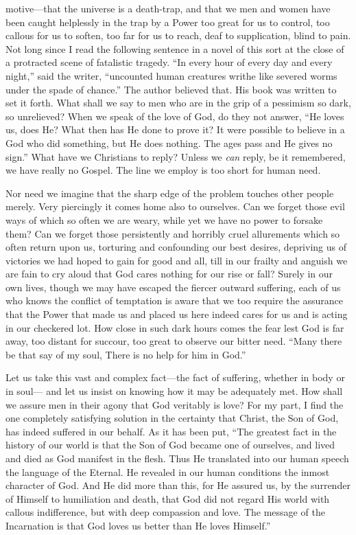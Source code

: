 \documentclass[12pt,a5paper,oneside]{book}
\begin{document}
motive---that the universe is a death-trap,
and that we men and women have been caught
helplessly in the trap by a Power too great
for us to control, too callous for us to soften, too
far for us to reach, deaf to supplication, blind
to pain. Not long since I read the following
sentence in a novel of this sort at the close of a
protracted scene of fatalistic tragedy. ``In every
hour of every day and every night,'' said the
writer, ``uncounted human creatures writhe
like severed worms under the spade of chance.''
The author believed that. His book was
written to set it forth. What shall we say
to men who are in the grip of a pessimism so
dark, so unrelieved? When we speak of the
love of God, do they not answer, ``He loves
us, does He? What then has He done to prove
it? It were possible to believe in a God who
did something, but He does nothing. The
ages pass and He gives no sign.'' What have
we Christians to reply? Unless we \textit{can} reply,
be it remembered, we have really no Gospel.
The line we employ is too short for human need.

Nor need we imagine that the sharp edge
of the problem touches other people merely.
Very piercingly it comes home also to
ourselves. Can we forget those evil ways of
which so often we are weary, while yet we have
no power to forsake them? Can we forget
those persistently and horribly cruel allurements 
which so often return upon us, torturing
and confounding our best desires, depriving us
of victories we had hoped to gain for good
and all, till in our frailty and anguish we
are fain to cry aloud that God cares nothing
for our rise or fall? Surely in our own lives,
though we may have escaped the fiercer outward 
suffering, each of us who knows the
conflict of temptation is aware that we too require
the assurance that the Power that made us
and placed us here indeed cares for us and is
acting in our checkered lot. How close in such
dark hours comes the fear lest God is far
away, too distant for succour, too great to
observe our bitter need. ``Many there be that
say of my soul, There is no help for him
in God.''

Let us take this vast and complex fact---the
fact of suffering, whether in body or in soul---
and let us insist on knowing how it may be
adequately met. How shall we assure men in
their agony that God veritably is love? For
my part, I find the one completely satisfying
solution in the certainty that Christ, the Son
of God, has indeed suffered in our behalf.
As it has been put, ``The greatest fact in
the history of our world is that the Son of
God became one of ourselves, and lived and
died as God manifest in the flesh. Thus He
translated into our human speech the language
of the Eternal. He revealed in our human
conditions the inmost character of God. And
He did more than this, for He assured us, by
the surrender of Himself to humiliation and
death, that God did not regard His world with
callous indifference, but with deep compassion
and love. The message of the Incarnation
is that God loves us better than He loves
Himself.''
\end{document}

